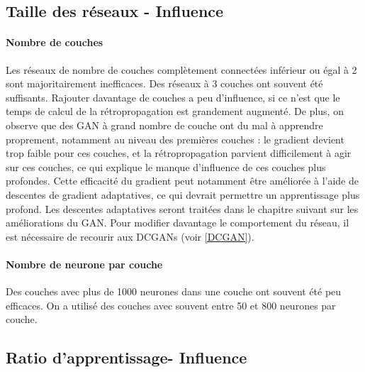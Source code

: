 \subsection{Taille des réseaux - Influence}
\paragraph{Nombre de couches}
Les réseaux de nombre de couches complètement connectées inférieur ou égal à 2 sont majoritairement inefficaces. Des réseaux à 3 couches ont souvent été suffisants. Rajouter davantage de couches a peu d'influence, si ce n'est que le temps de calcul de la rétropropagation est grandement augmenté. De plus, on observe que des GAN à grand nombre de couche ont du mal à apprendre proprement, notamment au niveau des premières couches : le gradient devient trop faible pour ces couches, et la rétropropagation parvient difficilement à agir sur ces couches, ce qui explique le manque d'influence de ces couches plus profondes. Cette efficacité du gradient peut notamment être améliorée à l'aide de descentes de gradient adaptatives, ce qui devrait permettre un apprentissage plus profond. Les descentes adaptatives seront traitées dans le chapitre suivant sur les améliorations du GAN.\newline
Pour modifier davantage le comportement du réseau, il est nécessaire de recourir aux DCGANs (voir \ref{DCGAN}). 
\paragraph{Nombre de neurone par couche}
Des couches avec plus de 1000 neurones dans une couche ont souvent été peu efficaces. On a utilisé des couches avec souvent entre 50 et 800 neurones par couche. 

\subsection{Ratio d'apprentissage- Influence}

